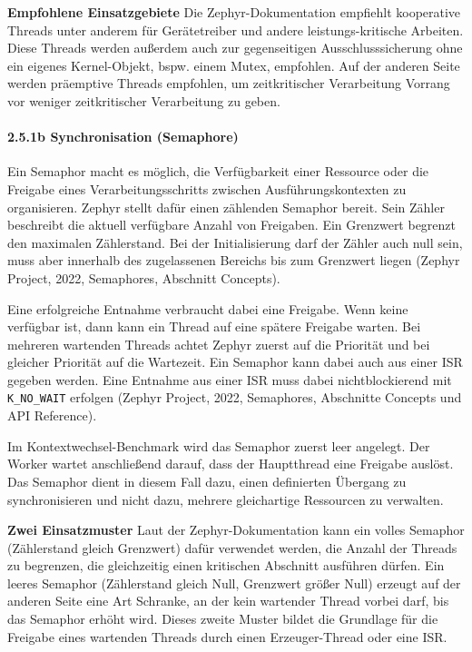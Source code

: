 \textbf{Empfohlene Einsatzgebiete} Die Zephyr-Dokumentation empfiehlt kooperative Threads unter anderem f{\"u}r Ger{\"a}tetreiber und andere leistungs-kritische Arbeiten. Diese Threads werden au{\ss}erdem auch zur gegenseitigen Ausschlusssicherung ohne ein eigenes Kernel-Objekt, bspw. einem Mutex, empfohlen. Auf der anderen Seite werden pr{\"a}emptive Threads empfohlen, um zeitkritischer Verarbeitung Vorrang vor weniger zeitkritischer Verarbeitung zu geben.

\paragraph*{\textbf{2.5.1b Synchronisation (Semaphore)}}
Ein Semaphor macht es m{\"o}glich, die Verf{\"u}gbarkeit einer Ressource oder die Freigabe eines Verarbeitungsschritts zwischen Ausf{\"u}hrungskontexten zu organisieren. Zephyr stellt daf{\"u}r einen z{\"a}hlenden Semaphor bereit. Sein Z{\"a}hler beschreibt die aktuell verf{\"u}gbare Anzahl von Freigaben. Ein Grenzwert begrenzt den maximalen Z{\"a}hlerstand. Bei der Initialisierung darf der Z{\"a}hler auch null sein, muss aber innerhalb des zugelassenen Bereichs bis zum Grenzwert liegen (Zephyr Project, 2022, \glqq{}Semaphores\grqq{}, Abschnitt \glqq{}Concepts\grqq{}).

Eine erfolgreiche Entnahme verbraucht dabei eine Freigabe. Wenn keine verf{\"u}gbar ist, dann kann ein Thread auf eine sp{\"a}tere Freigabe warten. Bei mehreren wartenden Threads achtet Zephyr zuerst auf die Priorit{\"a}t und bei gleicher Priorit{\"a}t auf die Wartezeit. Ein Semaphor kann dabei auch aus einer ISR gegeben werden. Eine Entnahme aus einer ISR muss dabei nichtblockierend mit \lstinline[style=fileinline]|K_NO_WAIT| erfolgen (Zephyr Project, 2022, \glqq{}Semaphores\grqq{}, Abschnitte \glqq{}Concepts\grqq{} und \glqq{}API Reference\grqq{}).

Im Kontextwechsel-Benchmark wird das Semaphor zuerst leer angelegt. Der Worker wartet anschlie{\ss}end darauf, dass der Hauptthread eine Freigabe ausl{\"o}st. Das Semaphor dient in diesem Fall dazu, einen definierten {\"U}bergang zu synchronisieren und nicht dazu, mehrere gleichartige Ressourcen zu verwalten.

\textbf{Zwei Einsatzmuster} Laut der Zephyr-Dokumentation kann ein \glqq{}volles\grqq{} Semaphor (Z{\"a}hlerstand gleich Grenzwert) daf{\"u}r verwendet werden, die Anzahl der Threads zu begrenzen, die gleichzeitig einen kritischen Abschnitt ausf{\"u}hren d{\"u}rfen. Ein \glqq{}leeres\grqq{} Semaphor (Z{\"a}hlerstand gleich Null, Grenzwert gr{\"o}{\ss}er Null) erzeugt auf der anderen Seite eine Art Schranke, an der kein wartender Thread vorbei darf, bis das Semaphor erh{\"o}ht wird. Dieses zweite Muster bildet die Grundlage f{\"u}r die Freigabe eines wartenden Threads durch einen Erzeuger-Thread oder eine ISR.

